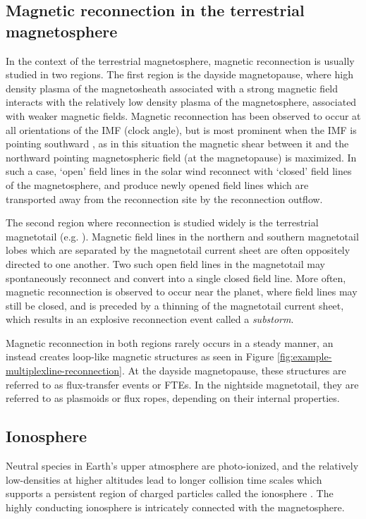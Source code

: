 \subsection{Magnetic reconnection in the terrestrial magnetosphere}
In the context of the terrestrial magnetosphere, magnetic reconnection is usually studied in two regions. The first region is the dayside magnetopause, where high density plasma of the magnetosheath associated with a strong magnetic field interacts with the relatively low density plasma of the magnetosphere, associated with weaker magnetic fields. Magnetic reconnection has been observed to occur at all orientations of the IMF (clock angle), but is most prominent when the IMF is pointing southward \cite{Swisdak2003DiamagneticMagnetopause}, as in this situation the magnetic shear between it and the northward pointing magnetospheric field (at the magnetopause) is maximized. In such a case, `open' field lines in the solar wind reconnect with `closed' field lines of the magnetosphere, and produce newly opened field lines which are transported away from the reconnection site by the reconnection outflow.

The second region where reconnection is studied widely is the terrestrial magnetotail (e.g. ). Magnetic field lines in the northern and southern magnetotail lobes which are separated by the magnetotail current sheet are often oppositely directed to one another. Two such open field lines in the magnetotail may spontaneously reconnect and convert into a single closed field line. More often, magnetic reconnection is observed to occur near the planet, where field lines may still be closed, and is preceded by a thinning of the magnetotail current sheet, which results in an explosive reconnection event called a \emph{substorm}. 

Magnetic reconnection in both regions rarely occurs in a steady manner, an instead creates loop-like magnetic structures as seen in Figure \ref{fig:example-multiplexline-reconnection}. At the dayside magnetopause, these structures are referred to as flux-transfer events or FTEs. In the nightside magnetotail, they are referred to as plasmoids or flux ropes, depending on their internal properties. 

\subsection{Ionosphere}
Neutral species in Earth's upper atmosphere are photo-ionized, and the relatively low-densities at higher altitudes lead to longer collision time scales which supports a persistent region of charged particles called the ionosphere \cite{Schunk2009Ionospheres}. The highly conducting ionosphere is intricately connected with the magnetosphere.

